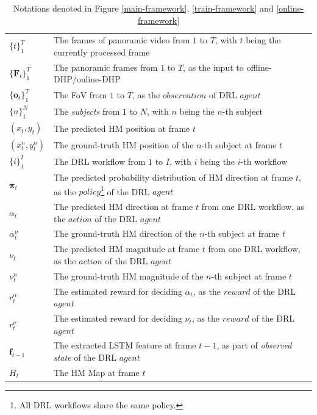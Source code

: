 \documentclass[10pt,journal,compsoc]{IEEEtran}
\begin{document}
\begin{table}
\center
\caption{Notations denoted in Figure \ref{main-framework}, \ref{train-framework} and \ref{online-framework}} \label{notation_framework}
\begin{tabular}{ll}
$\{t\}_{1}^{T}$ & The frames of panoramic video from $1$ to $T$, with $t$ being the currently processed frame \\
$\{\mathbf{F}_t\}_1^{T}$ & The panoramic frames from $1$ to $T$, as the input to offline-DHP/online-DHP\\
$\{\mathbf{o}_t\}_1^{T}$ & The FoV from $1$ to $T$, as the $observation$ of DRL $agent$ \\
$\{n\}_{1}^{N}$ & The \textit{subjects} from $1$ to $N$, with $n$ being the $n$-th subject\\
$(x_t, y_t)$ & The predicted HM position at frame $t$ \\
$(x^n_t, y^n_t)$ & The ground-truth HM position of the $n$-th subject at frame $t$ \\
$\{i\}_{1}^{I}$ & The DRL workflow from $1$ to $I$, with $i$ being the $i$-th workflow \\
$\mathbf{\pi}_t$ & The predicted probability distribution of HM direction at frame $t$, as the $policy$\footnote{All DRL workflows share the same policy.} of the DRL $agent$ \\
$\alpha_t$ & The predicted HM direction at frame $t$ from one DRL workflow, as the $action$ of the DRL $agent$ \\
$\alpha^n_t$ & The ground-truth HM direction of the $n$-th subject at frame $t$ \\
$\nu_t$ & The predicted HM magnitude at frame $t$ from one DRL workflow, as the $action$ of the DRL $agent$ \\
$\nu^n_t$ & The ground-truth HM magnitude of the $n$-th subject at frame $t$ \\
$r^{\alpha}_t$ & The estimated reward for deciding $\alpha_t$, as the $reward$ of the DRL $agent$ \\
$r^{\nu}_t$ & The estimated reward for deciding $\nu_t$, as the $reward$ of the DRL $agent$ \\
$\mathbf{f}_{t-1}$ & The extracted LSTM feature \cite{hausknecht2015deep} at frame $t-1$,  as part of \textit{observed state} of the DRL $agent$ \\
${H}_{t}$ & The HM Map at frame $t$ \\
\end{tabular}
\end{table}
\end{document}
